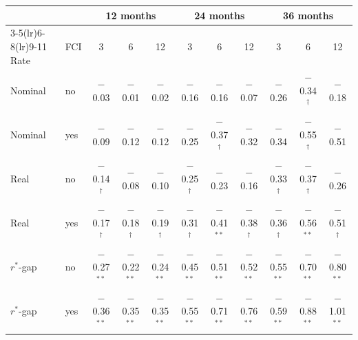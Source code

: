 \begin{tabular}{llccccccccc}
\toprule
 & & \multicolumn{3}{c}{12 months} & \multicolumn{3}{c}{24 months} & \multicolumn{3}{c}{36 months}\\
\cmidrule(lr){3-5}\cmidrule(lr){6-8}\cmidrule(lr){9-11}
Rate & FCI & 3 & 6 & 12 & 3 & 6 & 12 & 3 & 6 & 12 \\
\midrule
Nominal & no & $-$0.03 & $-$0.01 & $-$0.02 & $-$0.16 & $-$0.16 & $-$0.07 & $-$0.26 & $-$0.34$^{\dagger}$ & $-$0.18 \\
Nominal & yes & $-$0.09 & $-$0.12 & $-$0.12 & $-$0.25 & $-$0.37$^{\dagger}$ & $-$0.32 & $-$0.34 & $-$0.55$^{\dagger}$ & $-$0.51 \\
\midrule
Real & no & $-$0.14$^{\dagger}$ & $-$0.08 & $-$0.10 & $-$0.25$^{\dagger}$ & $-$0.23 & $-$0.16 & $-$0.33$^{\dagger}$ & $-$0.37$^{\dagger}$ & $-$0.26 \\
Real & yes & $-$0.17$^{\dagger}$ & $-$0.18$^{\dagger}$ & $-$0.19$^{\dagger}$ & $-$0.31$^{\dagger}$ & $-$0.41$^{**}$ & $-$0.38$^{\dagger}$ & $-$0.36$^{\dagger}$ & $-$0.56$^{**}$ & $-$0.51$^{\dagger}$ \\
\midrule
$r^*$-gap & no & $-$0.27$^{**}$ & $-$0.22$^{**}$ & $-$0.24$^{**}$ & $-$0.45$^{**}$ & $-$0.51$^{**}$ & $-$0.52$^{**}$ & $-$0.55$^{**}$ & $-$0.70$^{**}$ & $-$0.80$^{**}$ \\
$r^*$-gap & yes & $-$0.36$^{**}$ & $-$0.35$^{**}$ & $-$0.35$^{**}$ & $-$0.55$^{**}$ & $-$0.71$^{**}$ & $-$0.76$^{**}$ & $-$0.59$^{**}$ & $-$0.88$^{**}$ & $-$1.01$^{**}$ \\
\bottomrule
\end{tabular}
